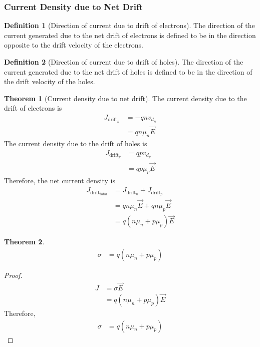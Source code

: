 \documentclass[titlepage, fleqn, a4paper, 12pt, twoside]{article}
\theoremstyle{definition}
\newtheorem{definition}{Definition}
\theoremstyle{theorem}
\newtheorem{theorem}{Theorem}
\let\Oldsubsubsection\subsubsection
\renewcommand{\subsubsection}{\FloatBarrier\Oldsubsubsection}
\begin{document}
\subsubsection{Current Density due to Net Drift}

\begin{definition}[Direction of current due to drift of electrons]
	The direction of the current generated due to the net drift of electrons is defined to be in the direction opposite to the drift velocity of the electrons.
\end{definition}

\begin{definition}[Direction of current due to drift of holes]
	The direction of the current generated due to the net drift of holes is defined to be in the direction of the drift velocity of the holes.
\end{definition}

\begin{theorem}[Current density due to net drift]
	The current density due to the drift of electrons is
	\begin{align*}
		J_{\text{drift}_n} &= -q n v_{d_n}\\
		&= q n \mu_n \overrightarrow{E}
	\end{align*}
	The current density due to the drift of holes is
	\begin{align*}
		J_{\text{drift}_p} &= q p v_{d_p}\\
		&= q p \mu_p \overrightarrow{E}
	\end{align*}
	Therefore, the net current density is
	\begin{align*}
		J_{\text{drift}_{\text{total}}} &= J_{\text{drift}_n} + J_{\text{drift}_p}\\
		&= q n \mu_n \overrightarrow{E} + q n \mu_p \overrightarrow{E}\\
		&= q (n \mu_n + p \mu_p) \overrightarrow{E}
	\end{align*}
\end{theorem}

\begin{theorem}
	\begin{align*}
		\sigma &= q (n \mu_n + p \mu_p)
	\end{align*}
\end{theorem}

\begin{proof}
	\begin{align*}
		J &= \sigma \overrightarrow{E}\\
		&= q (n \mu_n + p \mu_p) \overrightarrow{E}
	\end{align*}
	Therefore,
	\begin{align*}
		\sigma &= q (n \mu_n + p \mu_p)
	\end{align*}
\end{proof}
\end{document}
